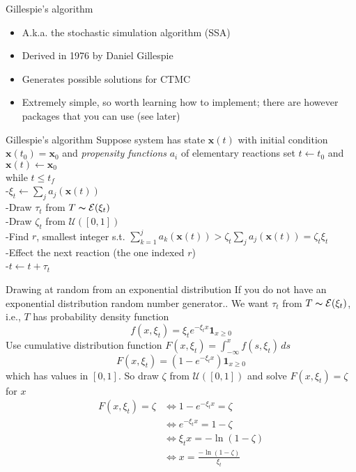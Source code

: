 \documentclass[aspectratio=169]{beamer}\usepackage[]{graphicx}\usepackage[]{xcolor}
\begin{document}
\begin{frame}{Gillespie's algorithm}
    \begin{itemize}
        \item A.k.a. the stochastic simulation algorithm (SSA)
        \vfill
        \item Derived in 1976 by Daniel Gillespie
        \vfill
        \item Generates possible solutions for CTMC
        \vfill
        \item Extremely simple, so worth learning how to implement; there are however packages that you can use (see later)
    \end{itemize}
\end{frame}


\begin{frame}{Gillespie's algorithm}
Suppose system has state $\mathbf{x}(t)$ with initial condition $\mathbf{x}(t_0)=\mathbf{x}_0$ and \emph{propensity functions} $a_i$ of elementary reactions
\vfill
set $t\leftarrow t_0$ and $\mathbf{x}(t)\leftarrow \mathbf{x}_0$\\
while {$t\leq t_f$}\\
-\qquad $\xi_t\leftarrow \sum_j a_j(\mathbf{x}(t))$\\
-\qquad Draw $\tau_t$ from $T\thicksim \mathcal{E}(\xi_t)$\\
-\qquad Draw $\zeta_t$ from $\mathcal{U}([0,1])$\\
-\qquad Find $r$, smallest integer s.t. $\sum_{k=1}^j a_k(\mathbf{x}(t))> \zeta_t\sum_j a_j(\mathbf{x}(t))=\zeta_t\xi_t$\\
-\qquad Effect the next reaction (the one indexed $r$)\\
-\qquad $t\leftarrow t+\tau_t$\\    
\end{frame}


\begin{frame}{Drawing at random from an exponential distribution}
    If you do not have an exponential distribution random number generator.. We want $\tau_t$ from $T\thicksim\mathcal{E}(\xi_t)$, i.e., $T$ has probability density function
    $$
    f(x,\xi_t)=
    \xi_te^{-\xi_t x}\mathbf{1}_{x\geq 0}
    $$
    Use cumulative distribution function $F(x,\xi_t)=\int_{-\infty}^x f(s,\xi_t)\,ds$
    $$
    F(x,\xi_t)=
    (1-e^{-\xi_t x})\mathbf{1}_{x\geq 0}
    $$
    which has values in $[0,1]$. So draw $\zeta$ from $\mathcal{U}([0,1])$ and solve $F(x,\xi_t)=\zeta$ for $x$
    \begin{align*}
    F(x,\xi_t)=\zeta & \Leftrightarrow 1-e^{-\xi_tx}=\zeta \\
    &\Leftrightarrow e^{-\xi_tx} = 1-\zeta \\
    &\Leftrightarrow \xi_tx = -\ln(1-\zeta) \\
    &\Leftrightarrow \boxed{x = \frac{-\ln(1-\zeta)}{\xi_t}}
    \end{align*}
\end{frame}
\end{document}
